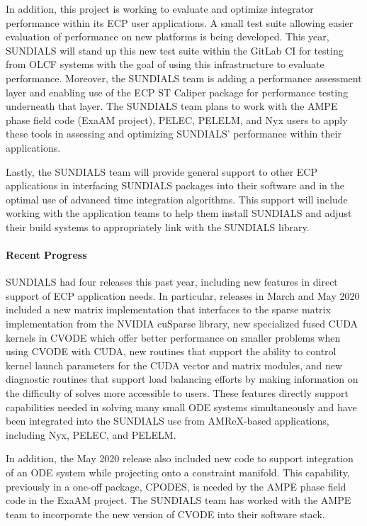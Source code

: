 In addition, this project is working to evaluate and optimize integrator performance within its ECP user applications.  A small test suite allowing easier evaluation of performance on new platforms is being developed.  This year, SUNDIALS will stand up this new test suite within the GitLab CI for testing from OLCF systems with the goal of using this infrastructure to evaluate performance.  Moreover, the SUNDIALS team is adding a performance assessment layer and enabling use of the ECP ST Caliper package for performance testing underneath that layer.  The SUNDIALS team plans to work with the AMPE phase field code (ExaAM project), PELEC, PELELM, and Nyx users to apply these tools in assessing and optimizing SUNDIALS' performance within their applications.

Lastly, the SUNDIALS team will provide general support to other ECP applications in interfacing SUNDIALS packages into their software and in the optimal use of advanced time integration algorithms.  This support will include working with the application teams to help them install SUNDIALS and adjust their build systems to appropriately link with the SUNDIALS library.

\paragraph{Recent Progress}
SUNDIALS had four releases this past year, including new features in direct support of ECP application needs.  In particular, releases in March and May 2020 included a new matrix implementation that interfaces to the sparse matrix implementation from the NVIDIA cuSparse library, new specialized fused CUDA kernels in CVODE which offer better performance on smaller problems when using CVODE with CUDA, new routines that support the ability to control kernel launch parameters for the CUDA vector and matrix modules, and new diagnostic routines that support load balancing efforts by making information on the difficulty of solves more accessible to users.  These features directly support capabilities needed in solving many small ODE systems simultaneously and have been integrated into the SUNDIALS use from AMReX-based applications, including Nyx, PELEC, and PELELM.

In addition, the May 2020 release also included new code to support integration of an ODE system while projecting onto a constraint manifold.  This capability, previously in a one-off package, CPODES, is needed by the AMPE phase field code in the ExaAM project.  The SUNDIALS team has worked with the AMPE team to incorporate the new version of CVODE into their software stack.

